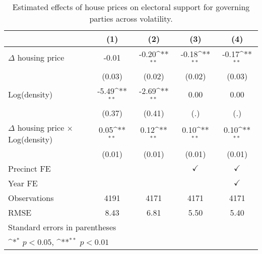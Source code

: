 \begin{table}[htbp]\centering
\def\sym#1{\ifmmode^{#1}\else\(^{#1}\)\fi}
\caption{Estimated effects of house prices on electoral support for governing parties across volatility.} \label{predens}
\begin{tabular}{l*{4}{c}}
\hline\hline
                    &\multicolumn{1}{c}{(1)}        &\multicolumn{1}{c}{(2)}        &\multicolumn{1}{c}{(3)}        &\multicolumn{1}{c}{(4)}        \\
\hline
$\Delta$ housing price&       -0.01        &       -0.20\sym{**}&       -0.18\sym{**}&       -0.17\sym{**}\\
                    &      (0.03)        &      (0.02)        &      (0.02)        &      (0.03)        \\
[1em]
Log(density)        &       -5.49\sym{**}&       -2.69\sym{**}&        0.00        &        0.00        \\
                    &      (0.37)        &      (0.41)        &         (.)        &         (.)        \\
[1em]
$\Delta$ housing price $\times$ Log(density)&        0.05\sym{**}&        0.12\sym{**}&        0.10\sym{**}&        0.10\sym{**}\\
                    &      (0.01)        &      (0.01)        &      (0.01)        &      (0.01)        \\
[1em]
\hline Precinct FE  &                    &                    &$\checkmark$        &$\checkmark$        \\
[1em]
Year FE             &                    &                    &                    &$\checkmark$        \\
\hline
Observations        &        4191        &        4171        &        4171        &        4171        \\
RMSE                &        8.43        &        6.81        &        5.50        &        5.40        \\
\hline\hline
\multicolumn{5}{l}{\footnotesize Standard errors in parentheses}\\
\multicolumn{5}{l}{\footnotesize \sym{*} \(p<0.05\), \sym{**} \(p<0.01\)}\\
\end{tabular}
\end{table}
